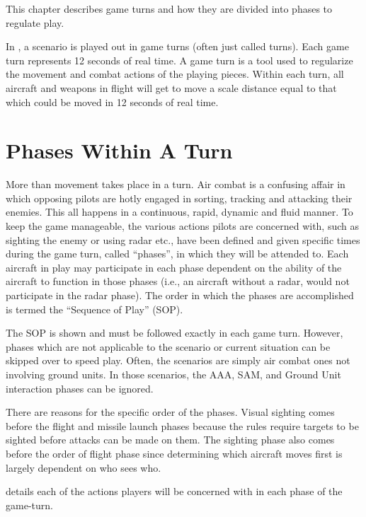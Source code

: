 

This chapter describes game turns and how they are divided into phases to regulate play.

In {\AirPow}, a scenario is played out in game turns (often just called turns). Each game turn represents 12 seconds of real time.  A game turn is a tool used to regularize the movement and combat actions of the playing pieces. Within each turn, all aircraft and weapons in flight will get to move a scale distance equal to that which could be moved in 12 seconds of real time.

\section{Phases Within A Turn}
\label{rule:phases}

More than movement takes place in a turn. Air combat is a confusing affair in which opposing pilots are hotly engaged in sorting, tracking and attacking their enemies. This all happens in a continuous, rapid, dynamic and fluid manner. To keep the game manageable, the various actions pilots are concerned with, such as sighting the enemy or using radar etc., have been defined and given specific times during the game turn, called “phases”, in which they will be attended to. Each aircraft in play may participate in each phase dependent on the ability of the aircraft to function in those phases (i.e., an aircraft without a radar, would not participate in the radar phase). The order in which the phases are accomplished is termed the “Sequence of Play” (SOP).

The {\AirPow} SOP is shown  and must be followed exactly in each game turn. However, phases which are not applicable to the scenario or current situation can be skipped over to speed play. Often, the scenarios are simply air combat ones not involving ground units. In those scenarios, the AAA, SAM, and Ground Unit interaction phases can be ignored.


There are reasons for the specific order of the phases. Visual sighting comes before the flight and missile launch phases because the rules require targets to be sighted before attacks can be made on them. The sighting phase also comes before the order of flight phase since determining which aircraft moves first is largely dependent on who sees who.


 details each of the actions players will be concerned with in each phase of the game-turn.

